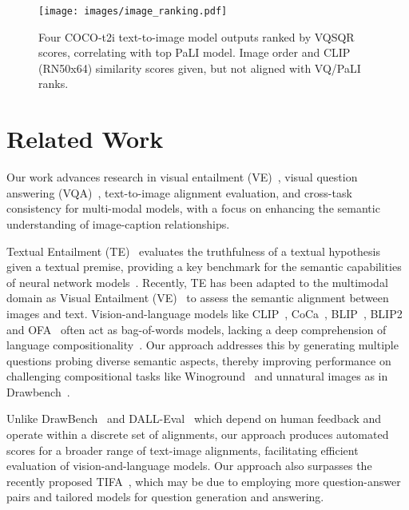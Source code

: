 \documentclass{article}
\newcommand{\VQSQR}[0]{VQ\xspace}
\begin{document}
\begin{figure}[!htbp]
    \centering
    \texttt{[image: images/image\_ranking.pdf]}
    \caption{Four COCO-t2i text-to-image model outputs ranked by VQSQR scores, correlating with top PaLI model. Image order and CLIP (RN50x64) similarity scores given, but not aligned with \VQSQR/PaLI ranks.}
    \label{fig:fig_image_gen_ranking}
\end{figure}  


\section{Related Work}
\label{sec:related}
Our work advances research in visual entailment (VE)~\citep{xie2019visual}, visual question answering (VQA)~\citep{antol2015vqa}, text-to-image alignment evaluation, and cross-task consistency for multi-modal models, with a focus on enhancing the semantic understanding of image-caption relationships.

Textual Entailment (TE)~\citep{dagan2010recognizing,SNLI} evaluates the truthfulness of a textual hypothesis given a textual premise, providing a key benchmark for the semantic capabilities of neural network models~\citep{BERT,T5,InstructGPT,chowdhery2022palm}. Recently, TE has been adapted to the multimodal domain as Visual Entailment (VE)~\citep{xie2019visual} to assess the semantic alignment between images and text. Vision-and-language models like CLIP~\citep{radford2021learning}, CoCa~\citep{yu2022coca}, BLIP~\citep{li2022blip}, BLIP2~\citep{li2023blip} and OFA~\citep{wang2022ofa} often act as bag-of-words models, lacking a deep comprehension of language compositionality~\citep{yuksekgonul2022and}. Our approach addresses this by generating multiple questions probing diverse semantic aspects, thereby improving performance on challenging compositional tasks like Winoground~\citep{thrush2022winoground} and unnatural images as in Drawbench~\citep{saharia2022photorealistic}.

Unlike DrawBench~\citep{saharia2022photorealistic} and DALL-Eval~\citep{cho2022dall} which depend on human feedback and operate within a discrete set of alignments, our approach produces automated scores for a broader range of text-image alignments, facilitating efficient evaluation of vision-and-language models. Our approach also surpasses the recently proposed TIFA~\citep{hu2023tifa}, which may be due to employing more question-answer pairs and tailored models for question generation and answering.
\end{document}
